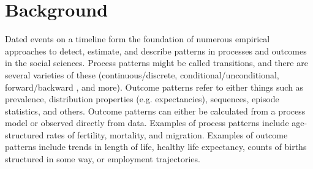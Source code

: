 \documentclass{bmcart}
\begin{document}
\begin{frontmatter}
\begin{abstractbox}

\begin{keyword}
\end{keyword}


\end{abstractbox}
%

\end{frontmatter}



\section*{Background}

Dated events on a timeline form the foundation of numerous empirical approaches to detect, estimate, and describe patterns in processes and outcomes in the social sciences. Process patterns might be called transitions, and there are several varieties of these (continuous/discrete, conditional/unconditional, forward/backward \citep{brouard2019backward}, and more). Outcome patterns refer to either things such as prevalence, distribution properties (e.g. expectancies), sequences, episode statistics, and others. Outcome patterns can either be calculated from a process model or observed directly from data. Examples of process patterns include age-structured rates of fertility, mortality, and migration. Examples of outcome patterns include trends in length of life, healthy life expectancy, counts of births structured in some way, or employment trajectories. 
\end{document}

